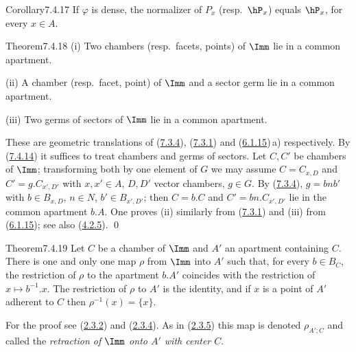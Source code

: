 \documentclass[12pt,a4paper,oneside,english]{smfart}
\makeatletter
\newcommand{\btanchor}[1]{\leavevmode\Hy@raisedlink{\hypertarget{bt:#1}{}}}
\newcommand{\btref}[1]{\hyperlink{bt:#1}{#1}}
\theoremstyle{definition}
\theoremstyle{bt}
\makeatother
\begin{document}
\begin{stmt}{Corollary}{7.4.17}\btanchor{7.4.17}
If $\varphi$ is dense, the normalizer of $P_x$ (resp.\ $\hP_x$) equals $\hP_x$, for
every $x\in A$.
\end{stmt}

\begin{stmt}{Theorem}{7.4.18}\btanchor{7.4.18}
(i) Two chambers (resp.\ facets, points) of $\Imm$ lie in a common apartment.

(ii) A chamber (resp.\ facet, point) of $\Imm$ and a sector germ lie in a common
apartment.

(iii) Two germs of sectors of $\Imm$ lie in a common apartment.
\end{stmt}

\pf These are geometric translations of (\btref{7.3.4}), (\btref{7.3.1}) and (\btref{6.1.15})\,a)
respectively. By (\btref{7.4.14}) it suffices to treat chambers and germs of sectors. Let
$C,C'$ be chambers of $\Imm$; transforming both by one element of $G$ we may assume
$C=C_{x,D}$ and $C'=g.C_{x',D'}$ with $x,x'\in A$, $D,D'$ vector chambers, $g\in G$.
By (\btref{7.3.4}), $g=bnb'$ with $b\in B_{x,D}$, $n\in N$, $b'\in B_{x',D'}$; then $C=b.C$
and $C'=bn.C_{x',D'}$ lie in the common apartment $b.A$. One proves (ii) similarly
from (\btref{7.3.1}) and (iii) from (\btref{6.1.15}); see also (\btref{4.2.5}). \qed

\begin{stmt}{Theorem}{7.4.19}\btanchor{7.4.19}
Let $C$ be a chamber of $\Imm$ and $A'$ an apartment containing $C$. There is one
and only one map $\rho$ from $\Imm$ into $A'$ such that, for every $b\in B_C$, the
restriction of $\rho$ to the apartment $b.A'$ coincides with the restriction of
$x\mapsto b^{-1}.x$. The restriction of $\rho$ to $A'$ is the identity, and if $x$
is a point of $A'$ adherent to $C$ then $\rho^{-1}(x)=\{x\}$.
\end{stmt}

For the proof see (\btref{2.3.2}) and (\btref{2.3.4}). As in (\btref{2.3.5}) this map is denoted
$\rho_{A';C}$ and called the \emph{retraction of $\Imm$ onto $A'$ with center $C$}.
\end{document}
